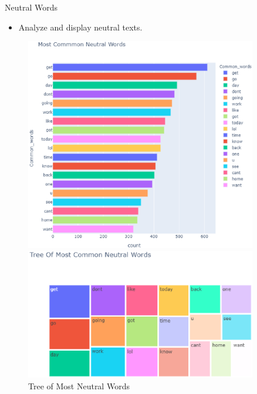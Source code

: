 \documentclass[
 size=14pt,
 paper=smartboard,  %
 mode=present, 		%
 display=slides, 	%
 style=tuliplab,  	%
 pauseslide,
 fleqn,leqno]{powerdot}
\begin{document}
\begin{slide}[toc=,bm=]{Neutral Words}
  \begin{itemize}
    \item Analyze and display neutral texts.
  \end{itemize}
  \begin{figure}[htbp]
    \centering
    \begin{minipage}[t]{0.48\textwidth}
      \centering
      \includegraphics[width=0.9\textwidth]{figures//neutral.eps}
      \vspace{-1.4em}
      \caption{Neutral Words}
    \end{minipage}
    \begin{minipage}[t]{0.48\textwidth}
      \centering
      \includegraphics[width=0.9\textwidth]{figures//neutral_tree.eps}
      \vspace{-1.4em}
      \caption{Tree of Most Neutral Words}
    \end{minipage}
  \end{figure}
\end{slide}
\end{document}
